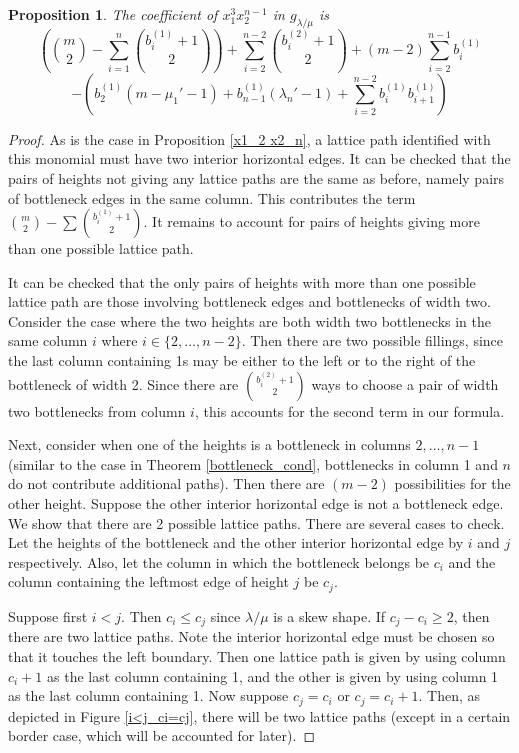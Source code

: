 \documentclass[12pt]{amsart}
\newtheorem{prop}[thm]{Proposition}
\theoremstyle{definition}
\begin{document}
\begin{prop}\label{x1_3 x2_n-1}
The coefficient of $x_1^3 x_2^{n-1}$ in $g_{\lambda/\mu}$ is 
\[
\left( \binom{m}{2} - \sum_{i=1}^{n} \binom{b^{(1)}_i+1}{2} \right) + \sum_{i=2}^{n-2} \binom{b_i^{(2)}+1}{2} + (m-2)\sum_{i=2}^{n-1} b_i^{(1)}\]\[ - 
 \left(b_2^{(1)}(m-\mu_1'-1) + b_{n-1}^{(1)}(\lambda_n'-1) + \sum_{i=2}^{n-2} b_i^{(1)}b_{i+1}^{(1)} \right)
\]
\end{prop}
\begin{proof}
As is the case in Proposition \ref{x1_2 x2_n}, a lattice path identified with this monomial must have two interior horizontal edges. It can be checked that the pairs of heights not giving any lattice paths are the same as before, namely pairs of bottleneck edges in the same column. This contributes the term  $\binom{m}{2} - \sum \binom{b^{(1)}_i+1}{2}$. It remains to account for pairs of heights giving more than one possible lattice path. 

It can be checked that the only pairs of heights with more than one possible lattice path are those involving bottleneck edges and bottlenecks of width two. Consider the case where the two heights are both width two bottlenecks in the same column $i$ where $i \in \{2,\ldots,n-2\}$. Then there are two possible fillings, since the last column containing 1s may be either to the left or to the right of the bottleneck of width 2. Since there are $\binom{b^{(2)}_i+1}{2}$ ways to choose a pair of width two bottlenecks from column $i$, this accounts for the second term in our formula. 

Next, consider when one of the heights is a bottleneck in columns $2,\ldots,n-1$ (similar to the case in Theorem \ref{bottleneck_cond}, bottlenecks in column 1 and $n$ do not contribute additional paths). Then there are $(m-2)$ possibilities for the other height. Suppose the other interior horizontal edge is not a bottleneck edge. We show that there are 2 possible lattice paths. There are several cases to check. Let the heights of the bottleneck and the other interior horizontal edge by $i$ and $j$ respectively. Also, let the column in which the bottleneck belongs be $c_i$ and the column containing the leftmost edge of height $j$ be $c_j$. 

Suppose first $i < j$. Then $c_i \leq c_j$ since $\lambda/\mu$ is a skew shape. If $c_j-c_i \geq 2$, then there are two lattice paths. Note the interior horizontal edge must be chosen so that it touches the left boundary. Then one lattice path is given by using column $c_i+1$ as the last column containing 1, and the other is given by using column 1 as the last column containing 1. Now suppose $c_j = c_i$ or $c_j = c_i + 1$. Then, as depicted in Figure \ref{i<j_ci=cj}, there will be two lattice paths (except in a certain border case, which will be accounted for later). 


\end{proof}
\end{document}
